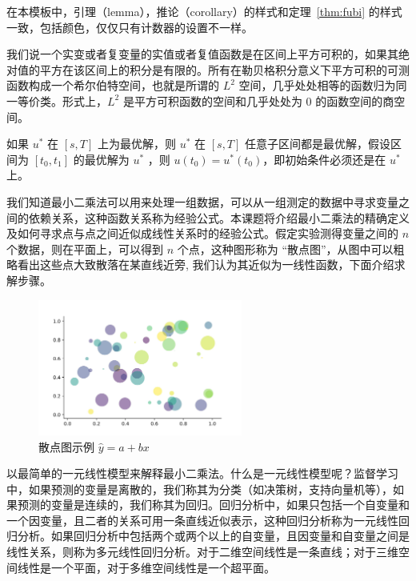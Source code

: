 \documentclass[lang=cn,newtx,10pt,scheme=chinese]{elegantbook}
\begin{document}
\begin{note}
在本模板中，引理（lemma），推论（corollary）的样式和定理~\ref{thm:fubi} 的样式一致，包括颜色，仅仅只有计数器的设置不一样。
\end{note}

我们说一个实变或者复变量的实值或者复值函数是在区间上平方可积的，如果其绝对值的平方在该区间上的积分是有限的。所有在勒贝格积分意义下平方可积的可测函数构成一个希尔伯特空间，也就是所谓的 $L^2$ 空间，几乎处处相等的函数归为同一等价类。形式上，$L^2$ 是平方可积函数的空间和几乎处处为 0 的函数空间的商空间。

\begin{proposition}[最优性原理] \label{pro:max}
如果 $u^*$ 在 $[s,T]$ 上为最优解，则 $u^*$ 在 $[s, T]$ 任意子区间都是最优解，假设区间为 $[t_0, t_1]$ 的最优解为 $u^*$ ，则 $u(t_0)=u^{*}(t_0)$，即初始条件必须还是在 $u^*$ 上。
\end{proposition}

我们知道最小二乘法可以用来处理一组数据，可以从一组测定的数据中寻求变量之间的依赖关系，这种函数关系称为经验公式。本课题将介绍最小二乘法的精确定义及如何寻求点与点之间近似成线性关系时的经验公式。假定实验测得变量之间的 $n$ 个数据，则在平面上，可以得到 $n$ 个点，这种图形称为 “散点图”，从图中可以粗略看出这些点大致散落在某直线近旁, 我们认为其近似为一线性函数，下面介绍求解步骤。

\begin{figure}[htbp]
  \centering
  \includegraphics[width=0.6\textwidth]{image/scatter.jpg}
  \caption{散点图示例 $\hat{y}=a+bx$ \label{fig:scatter}}
\end{figure}

以最简单的一元线性模型来解释最小二乘法。什么是一元线性模型呢？监督学习中，如果预测的变量是离散的，我们称其为分类（如决策树，支持向量机等），如果预测的变量是连续的，我们称其为回归。回归分析中，如果只包括一个自变量和一个因变量，且二者的关系可用一条直线近似表示，这种回归分析称为一元线性回归分析。如果回归分析中包括两个或两个以上的自变量，且因变量和自变量之间是线性关系，则称为多元线性回归分析。对于二维空间线性是一条直线；对于三维空间线性是一个平面，对于多维空间线性是一个超平面。
\end{document}
